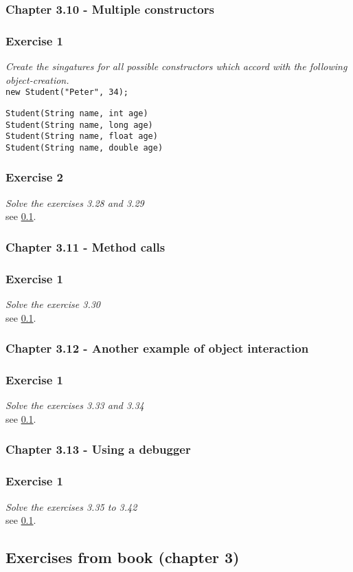 \subsubsection{Chapter 3.10 - Multiple constructors}

\subsubsection*{Exercise 1}
\textit{Create the singatures for all possible constructors which accord
with the following object-creation.}\\
\lstinline{new Student("Peter", 34);}
\begin{lstlisting}
Student(String name, int age)
Student(String name, long age)
Student(String name, float age)
Student(String name, double age)
\end{lstlisting}

\subsubsection*{Exercise 2}
\textit{Solve the exercises 3.28 and 3.29}\\
see \ref{book_oop4}. 

\subsubsection{Chapter 3.11 - Method calls}

\subsubsection*{Exercise 1}
\textit{Solve the exercise 3.30}\\
see \ref{book_oop4}. 

\subsubsection{Chapter 3.12 - Another example of object interaction}

\subsubsection*{Exercise 1}
\textit{Solve the exercises 3.33 and 3.34}\\
see \ref{book_oop4}. 

\subsubsection{Chapter 3.13 - Using a debugger}

\subsubsection*{Exercise 1}
\textit{Solve the exercises 3.35 to 3.42}\\
see \ref{book_oop4}. 

\subsection{Exercises from book (chapter 3)}
\label{book_oop4}